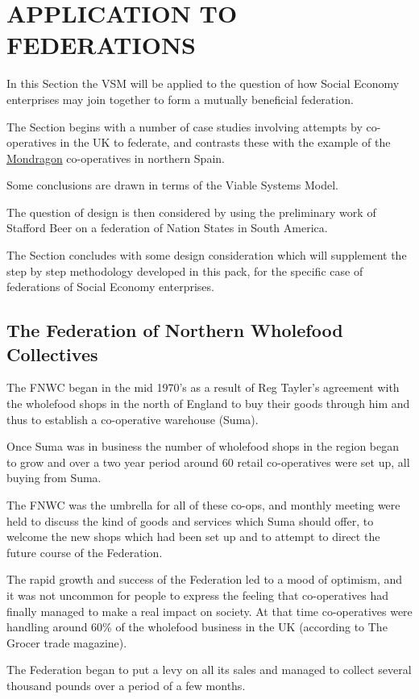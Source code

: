 \chapter{APPLICATION TO FEDERATIONS}
  \label{APPLICATION TO FEDERATIONS}
In this Section the VSM will be applied to the question of how Social Economy enterprises may join together to form a mutually beneficial federation.

The Section begins with a number of case studies involving attempts by co-operatives in the UK to federate, and contrasts these with the example of the \href{https://www.mondragon-corporation.com/en/}{Mondragon} co-operatives in northern Spain.

Some conclusions are drawn in terms of the Viable Systems Model.

The question of design is then considered by using the preliminary work of Stafford Beer on a federation of Nation States in South America.

The Section concludes with some design consideration which will supplement the step by step methodology developed in this pack, for the specific case of federations of Social Economy enterprises.

\section*{The Federation of Northern Wholefood Collectives}
The FNWC began in the mid 1970's as a result of Reg Tayler's agreement with the wholefood shops in the north of England to buy their goods through him and thus to establish a co-operative warehouse (Suma).

Once Suma was in business the number of wholefood shops in the region began to grow and over a two year period around 60 retail co-operatives were set up, all buying from Suma.

The FNWC was the umbrella for all of these co-ops, and monthly meeting were held to discuss the kind of goods and services which Suma should offer, to welcome the new shops which had been set up and to attempt to direct the future course of the Federation.

The rapid growth and success of the Federation led to a mood of optimism, and it was not uncommon for people to express the feeling that co-operatives had finally managed to make a real impact on society. At that time co-operatives were handling around 60\% of the wholefood business in the UK (according to The Grocer trade magazine).

The Federation began to put a levy on all its sales and managed to collect several thousand pounds over a period of a few months.

